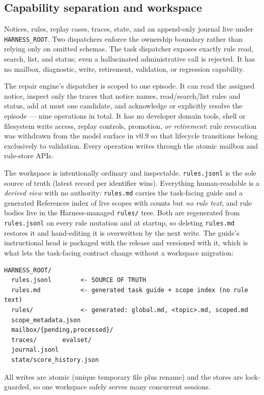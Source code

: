 \documentclass[11pt,letterpaper]{article}
\begin{document}
\subsection{Capability separation and workspace}
\label{sec:actionspace}

Notices, rules, replay cases, traces, state, and an append-only journal live under
\texttt{HARNESS\_ROOT}. Two dispatchers enforce the ownership boundary rather than relying only on
omitted schemas. The task dispatcher exposes exactly rule read, search, list, and status; even a
hallucinated administrative call is rejected. It has no mailbox, diagnostic, write, retirement,
validation, or regression capability.

The repair engine's dispatcher is scoped to one episode. It can read the assigned notice,
inspect only the traces that notice names, read/search/list rules and status, add at most one
candidate, and acknowledge or explicitly resolve the episode --- nine operations in total. It has no
developer domain tools, shell or filesystem write access, replay controls, promotion, \emph{or
retirement}: rule revocation was withdrawn from the model surface in v0.9 so that lifecycle
transitions belong exclusively to validation. Every operation writes through the atomic mailbox and
rule-store APIs.

The workspace is intentionally ordinary and inspectable. \texttt{rules.jsonl} is the sole source of
truth (latest record per identifier wins). Everything human-readable is a \emph{derived view} with no
authority: \texttt{rules.md} carries the task-facing guide and a generated References index of live
scopes with counts but \emph{no rule text}, and rule bodies live in the Harness-managed
\texttt{rules/} tree. Both are regenerated from \texttt{rules.jsonl} on every rule mutation and at
startup, so deleting \texttt{rules.md} restores it and hand-editing it is overwritten by the next
write. The guide's instructional head is packaged with the release and versioned with it, which is
what lets the task-facing contract change without a workspace migration:
\begin{lstlisting}[language={}]
HARNESS_ROOT/
  rules.jsonl        <- SOURCE OF TRUTH
  rules.md           <- generated task guide + scope index (no rule text)
  rules/             <- generated: global.md, <topic>.md, scoped.md
  scope_metadata.json
  mailbox/{pending,processed}/
  traces/       evalset/
  journal.jsonl
  state/score_history.json
\end{lstlisting}
All writes are atomic (unique temporary file plus rename) and the stores are lock-guarded, so one
workspace safely serves many concurrent sessions.
\end{document}
